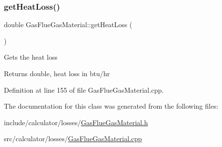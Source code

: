 \subsubsection{\texorpdfstring{get\+Heat\+Loss()}{getHeatLoss()}}
{\footnotesize\ttfamily double Gas\+Flue\+Gas\+Material\+::get\+Heat\+Loss (\begin{DoxyParamCaption}{ }\end{DoxyParamCaption})}

Gets the heat loss

\begin{DoxyReturn}{Returns}
double, heat loss in btu/hr 
\end{DoxyReturn}


Definition at line 155 of file Gas\+Flue\+Gas\+Material.\+cpp.



The documentation for this class was generated from the following files\+:\begin{DoxyCompactItemize}
\item 
include/calculator/losses/\hyperlink{_gas_flue_gas_material_8h}{Gas\+Flue\+Gas\+Material.\+h}\item 
src/calculator/losses/\hyperlink{_gas_flue_gas_material_8cpp}{Gas\+Flue\+Gas\+Material.\+cpp}\end{DoxyCompactItemize}

